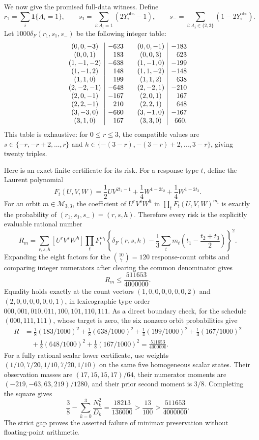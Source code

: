 We now give the promised full-data witness.  Define
\[
 r_1=\sum_i\mathbf1\{A_i=1\},\qquad
 s_1=\sum_{i:A_i=1}(2Y_i^{\mathrm{obs}}-1),\qquad
 s_-=\sum_{i:A_i\in\{2,3\}}(1-2Y_i^{\mathrm{obs}}).
\]
Let \(1000\delta_F(r_1,s_1,s_-)\) be the following integer table:
\[
\begin{array}{c|r@{\qquad}c|r}
(0,0,-3)&-623&(0,0,-1)&-183\\
(0,0,1)&183&(0,0,3)&623\\
(1,-1,-2)&-638&(1,-1,0)&-199\\
(1,-1,2)&148&(1,1,-2)&-148\\
(1,1,0)&199&(1,1,2)&638\\
(2,-2,-1)&-648&(2,-2,1)&-210\\
(2,0,-1)&-167&(2,0,1)&167\\
(2,2,-1)&210&(2,2,1)&648\\
(3,-3,0)&-660&(3,-1,0)&-167\\
(3,1,0)&167&(3,3,0)&660.
\end{array}
\]
This table is exhaustive: for \(0\leq r\leq3\), the compatible values are \(s\in\{-r,-r+2,\ldots,r\}\) and \(h\in\{-(3-r),-(3-r)+2,\ldots,3-r\}\), giving twenty triples.

Here is an exact finite certificate for its risk.  For a response type \(t\), define the Laurent polynomial
\[
 F_t(U,V,W)=\frac12UV^{2t_1-1}
 +\frac14W^{1-2t_2}+\frac14W^{1-2t_3}.
\]
For an orbit \(m\in\mathcal M_{3,3}\), the coefficient of \(U^rV^sW^h\) in \(\prod_tF_t(U,V,W)^{m_t}\) is exactly the probability of \((r_1,s_1,s_-)=(r,s,h)\).  Therefore every risk is the explicitly evaluable rational number
\[
 R_m=\sum_{r,s,h}[U^rV^sW^h]\prod_tF_t^{m_t}
 \left\{\delta_F(r,s,h)-\frac13\sum_tm_t
 \left(t_1-\frac{t_2+t_3}{2}\right)\right\}^2.
\]
Expanding the eight factors for the \(\binom{10}{7}=120\) response-count orbits and comparing integer numerators after clearing the common denominator gives
\[
 R_m\leq\frac{511653}{4000000}.
\]
Equality holds exactly at the count vectors \((1,0,0,0,0,0,0,2)\) and \((2,0,0,0,0,0,0,1)\), in lexicographic type order \(000,001,010,011,100,101,110,111\).  As a direct boundary check, for the schedule \((000,111,111)\), whose target is zero, the six nonzero orbit probabilities give
\[
 \begin{aligned}
 R&=\frac18(183/1000)^2+\frac18(638/1000)^2
 +\frac14(199/1000)^2+\frac14(167/1000)^2\\
 &\quad+\frac18(648/1000)^2+\frac18(167/1000)^2
 =\frac{511653}{4000000}.
 \end{aligned}
\]
For a fully rational scalar lower certificate, use weights \((1/10,7/20,1/10,7/20,1/10)\) on the same five homogeneous scalar states.  Their observation masses are \((17,15,15,17)/64\), their numerator moments are \((-219,-63,63,219)/1280\), and their prior second moment is \(3/8\).  Completing the square gives
\[
 \frac38-\sum_{k=0}^3\frac{N_k^2}{D_k}
 =\frac{18213}{136000}>\frac{13}{100}
 >\frac{511653}{4000000}.
\]
The strict gap proves the asserted failure of minimax preservation without floating-point arithmetic.

